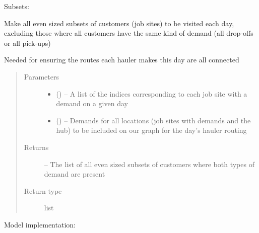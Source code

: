 \documentclass[letterpaper,10pt,english]{sphinxmanual}
\begin{document}
Subsets:

\begin{fulllineitems}
\label{\detokenize{daily-routing:parameters.make_subsets}}
Make all even sized subsets of customers (job sites) to be visited each
day, excluding those where all customers have the same kind of demand (all
drop-offs or all pick-ups)

Needed for ensuring the routes each hauler makes this day are all connected
\begin{quote}\begin{description}
\item[{Parameters}] \leavevmode\begin{itemize}
\item {} 
 () -- A list of the indices corresponding to each job site with a demand on
a given day

\item {} 
 () -- Demands for all locations (job sites with demands and the hub) to be
included on our graph for the day's hauler routing

\end{itemize}

\item[{Returns}] \leavevmode
{} -- The list of all even sized subsets of customers where both types of
demand are present

\item[{Return type}] \leavevmode
list

\end{description}\end{quote}

\end{fulllineitems}


Model implementation:
\end{document}

